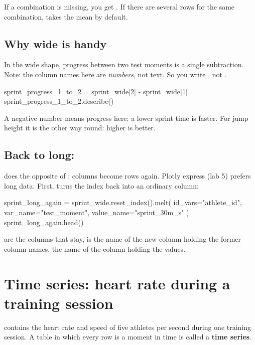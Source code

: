 \documentclass[11pt,a4paper]{article}
\begin{document}
If a combination is missing, you get . If there are several
rows for the same combination,  takes the mean by
default.

\subsection{Why wide is handy}

In the wide shape, progress between two test moments is a single
subtraction. Note: the column names here are \emph{numbers}, not text.
So you write , not .

\begin{python}
sprint_progress_1_to_2 = sprint_wide[2] - sprint_wide[1]
sprint_progress_1_to_2.describe()
\end{python}

A negative number means progress here: a lower sprint time is faster.
For jump height it is the other way round: higher is better.

\subsection{Back to long: }

 does the opposite of : columns become rows
again. Plotly express (lab 5) prefers long data. First,
 turns the index back into an ordinary column:

\begin{python}
sprint_long_again = sprint_wide.reset_index().melt(
    id_vars="athlete_id", var_name="test_moment", value_name="sprint_30m_s"
)
sprint_long_again.head()
\end{python}

 are the columns that stay,  is the name
of the new column holding the former column names, 
the name of the column holding the values.

\section{Time series: heart rate during a training session}

 contains the heart rate and speed of five athletes
per second during one training session. A table in which every row is a
moment in time is called a \textbf{time series}.
\end{document}
